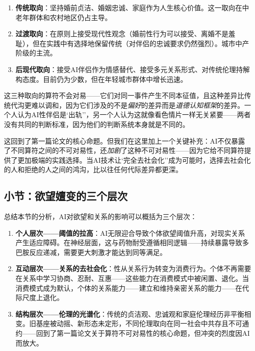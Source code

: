 \documentclass[12pt,a4paper]{ctexart}
\begin{document}
\begin{enumerate}[label=(\arabic*)]
\item \textbf{传统取向}：坚持婚前贞洁、婚姻忠诚、家庭作为人生核心价值。这一取向在中老年群体和农村地区仍占主导。
\item \textbf{过渡取向}：在原则上接受现代性观念（婚前性行为可以接受、离婚不是羞耻），但在实践中有选择地保留传统（对伴侣的忠诚要求仍然强烈）。城市中产阶级的主流。
\item \textbf{后现代取向}：接受AI伴侣作为情感替代、接受多元关系形式、对传统伦理持解构态度。目前仍为少数，但在年轻城市群体中增长迅速。
\end{enumerate}

这三种取向的算符不会对易——它们对同一事件产生不同本征值，且这种差异比传统代沟更难以调和，因为它们涉及的不是\emph{偏好}的差异而是\emph{道德认知框架}的差异。一个人认为AI性伴侣是`出轨''，另一个人认为这就像看色情片一样无关紧要——两者没有共同的判断标准，因为他们的判断系统本身就是不同的。

这回到了第一篇论文的核心命题。但我们在这里加上一个关键补充：AI不仅暴露了不同算符之间的不可对易性，还\textit{加剧}了这种不可对易性——因为它给不同算符提供了更加极端的实践选择。当AI技术让`完全去社会化''成为可能时，选择去社会化的人和拒绝的人之间的鸿沟，比以往任何代际差异都更深。

\subsection{小节：欲望嬗变的三个层次}

总结本节的分析，AI对欲望和关系的影响可以概括为三个层次：

\begin{enumerate}[label=层次\arabic*:]

\item \textbf{个人层次——阈值的拉高}：AI无限迎合导致个体欲望阈值升高，对现实关系产生适应障碍。在神经层面，这与药物耐受遵循相同逻辑——持续暴露导致多巴胺反应递减，需要更大刺激才能达到同等满足。

\item \textbf{互动层次——关系的去社会化}：性从关系行为转变为消费行为。个体不再需要在关系中学习协商、忍耐、互惠——这些能力在消费模式中被闲置、退化。当消费模式成为默认，个体的关系能力——建立和维持亲密关系的能力——在代际尺度上退化。

\item \textbf{结构层次——伦理的光谱化}：传统的贞洁观、忠诚观和家庭伦理经历非平衡相变。旧基座被动摇、新形态未定形，不同伦理取向在同一社会中共存且不可通约——回到了第一篇论文关于算符不可对易性的核心命题，但冲突的烈度因AI而放大。

\end{enumerate}
\end{document}
